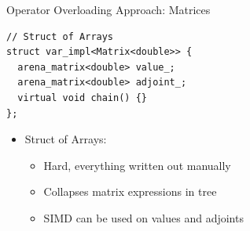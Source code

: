 \documentclass[dvipsnames, aspectratio=169]{beamer}
\begin{document}
\begin{frame}[fragile]{Operator Overloading Approach: Matrices}
\begin{verbatim}
// Struct of Arrays
struct var_impl<Matrix<double>> {
  arena_matrix<double> value_;
  arena_matrix<double> adjoint_;
  virtual void chain() {}
};
\end{verbatim}
\begin{itemize}
    \item Struct of Arrays:
    \begin{itemize}
        \item Hard, everything written out manually
        \item Collapses matrix expressions in tree
        \item SIMD can be used on values and adjoints
    \end{itemize}
\end{itemize}
\end{frame}
\note{
\begin{itemize}
\item[] 
\end{itemize}
}
\end{document}
